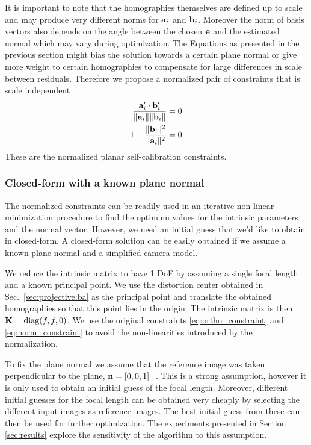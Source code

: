 \documentclass[10pt,twocolumn,letterpaper]{article}
\begin{document}
It is important to note that the homographies themselves are defined up to scale and may produce very different norms for $\mathbf{a}_i$ and $\mathbf{b}_i$. Moreover the norm of basis vectors also depends on the angle between the chosen $\mathbf{e}$ and the estimated normal which may vary during optimization. The Equations as presented in the previous section might bias the solution towards a certain plane normal or give more weight to certain homographies to compensate for large differences in scale between residuals. Therefore we propose a normalized pair of constraints that is scale independent 
\begin{align}
\frac{\mathbf{a}_i' \cdot \mathbf{b}_i'}{\lVert\mathbf{a}_i\rVert \lVert\mathbf{b}_i\rVert} = 0 \label{eq:ortho_constraint_normalized}\\
1 - \frac{\lVert\mathbf{b}_i\rVert^2}{\lVert\mathbf{a}_i\rVert^2} = 0 \label{eq:norm_constraint_normalized}
\end{align}
These are the normalized planar self-calibration constraints.

\subsubsection{Closed-form with a known plane normal}

The normalized constraints can be readily used in an iterative non-linear minimization procedure to find the optimum values for the intrinsic parameters and the normal vector. However, we need an initial guess that we'd like to obtain in closed-form. A closed-form solution can be easily obtained if we assume a known plane normal and a simplified camera model. 

We reduce the intrinsic matrix to have 1 DoF by assuming a single focal length and a known principal point. We use the distortion center obtained in Sec.~\ref{sec:projective:ba} as the principal point and translate the obtained homographies so that this point lies in the origin. The intrinsic matrix is then $\mathbf{K}=\text{diag}(f, f, 0)$. We use the original constraints \eqref{eq:ortho_constraint} and \eqref{eq:norm_constraint} to avoid the non-linearities introduced by the normalization.

To fix the plane normal we assume that the reference image was taken perpendicular to the plane, \ie $\mathbf{n}=[0,0,1]^\top$. This is a strong assumption, however it is only used to obtain an initial guess of the focal length. Moreover, different initial guesses for the focal length can be obtained very cheaply by selecting the different input images as reference images. The best initial guess from these can then be used for further optimization. The experiments presented in Section \ref{sec:results} explore the sensitivity of the algorithm to this assumption.
\end{document}
